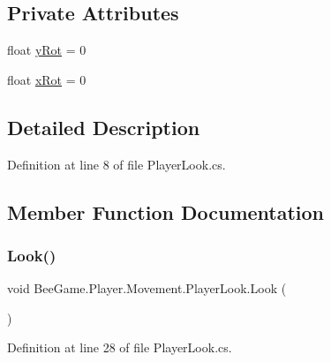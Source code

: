 \subsection*{Private Attributes}
\begin{DoxyCompactItemize}
\item 
float \hyperlink{class_bee_game_1_1_player_1_1_movement_1_1_player_look_a3eb9d7e0aad01bed50a29e2ae00b24d6}{y\+Rot} = 0
\item 
float \hyperlink{class_bee_game_1_1_player_1_1_movement_1_1_player_look_a1a939bae4cc533cc5bb4ad9aa6a5bd91}{x\+Rot} = 0
\end{DoxyCompactItemize}


\subsection{Detailed Description}


Definition at line 8 of file Player\+Look.\+cs.



\subsection{Member Function Documentation}
\mbox{\label{class_bee_game_1_1_player_1_1_movement_1_1_player_look_a7ff4392d11c1a3c25b80a207de1b5536}} 
\subsubsection{\texorpdfstring{Look()}{Look()}}
{\footnotesize\ttfamily void Bee\+Game.\+Player.\+Movement.\+Player\+Look.\+Look (\begin{DoxyParamCaption}{ }\end{DoxyParamCaption})\hspace{0.3cm}{\ttfamily [private]}}



Definition at line 28 of file Player\+Look.\+cs.



